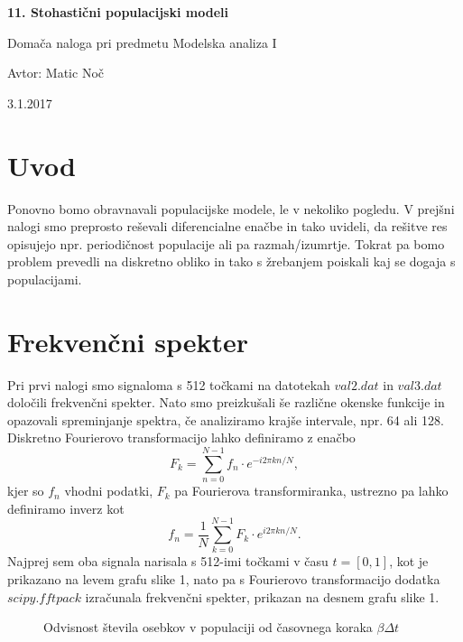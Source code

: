 \documentclass[11pt, a4paper]{article}
\begin{document}
    \begin{center}
    {\LARGE\bfseries 11. Stohastični populacijski modeli \par}
    \vspace{1cm}
    
    {\Large Domača naloga pri predmetu Modelska analiza I\par}
    \vspace{0.2cm}
    {\normalsize Avtor: Matic Noč \par}
    \vspace{0.2cm}    
    {\normalsize 3.1.2017 \par}    

    
    \end{center}
\section{Uvod}
Ponovno bomo obravnavali populacijske modele, le v nekoliko pogledu. V prejšni nalogi smo preprosto reševali diferencialne enačbe in tako uvideli, da rešitve res opisujejo npr. periodičnost populacije ali pa razmah/izumrtje. Tokrat pa bomo problem prevedli na diskretno obliko in tako s žrebanjem poiskali kaj se dogaja s populacijami.


\section{Frekvenčni spekter}
Pri prvi nalogi smo signaloma s 512 točkami na datotekah $val2.dat$ in $val3.dat$ določili frekvenčni spekter. Nato smo preizkušali še različne okenske funkcije in opazovali spreminjanje spektra, če analiziramo krajše intervale, npr. 64 ali 128.\newline
Diskretno Fourierovo transformacijo lahko definiramo z enačbo
\begin{equation}
F_k =  \sum_{n=0}^{N-1} f_n \cdot e^{-i 2 \pi k n / N}, 
\end{equation}
kjer so $f_n$ vhodni podatki, $F_k$ pa Fourierova transformiranka, ustrezno pa lahko definiramo inverz kot
\begin{equation}
f_n = \frac{1}{N} \sum_{k=0}^{N-1} F_k \cdot e^{i 2 \pi k n / N}.
\end{equation}
Najprej sem oba signala narisala s 512-imi točkami v času $t=[0,1]$, kot je prikazano na levem grafu slike 1, nato pa s Fourierovo transformacijo dodatka $scipy.fftpack$ izračunala frekvenčni spekter, prikazan na desnem grafu slike 1.

\begin{figure}[H]


\caption{Odvisnost števila osebkov v populaciji od časovnega koraka $\beta \Delta t$}  
\end{figure}
\end{document}
